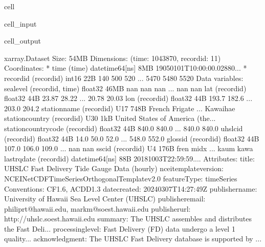 \documentclass[letterpaper,10pt,english]{jupyterBook}
\begin{document}
\begin{sphinxuseclass}{cell}
\begin{sphinxVerbatimInput}
\begin{sphinxuseclass}{cell_input}
\begin{sphinxVerbatim}[commandchars=\\\{\}]
\end{sphinxVerbatim}

\end{sphinxuseclass}\end{sphinxVerbatimInput}
\begin{sphinxVerbatimOutput}

\begin{sphinxuseclass}{cell_output}
\begin{sphinxVerbatim}[commandchars=\\\{\}]
\PYGZlt{}xarray.Dataset\PYGZgt{} Size: 54MB
Dimensions:               (time: 1043870, record\PYGZus{}id: 11)
Coordinates:
  * time                  (time) datetime64[ns] 8MB 1905\PYGZhy{}01\PYGZhy{}01T10:00:00.02880...
  * record\PYGZus{}id             (record\PYGZus{}id) int16 22B 140 500 520 ... 5470 5480 5520
Data variables:
    sea\PYGZus{}level             (record\PYGZus{}id, time) float32 46MB nan nan nan ... nan nan
    lat                   (record\PYGZus{}id) float32 44B 23.87 28.22 ... 20.78 20.03
    lon                   (record\PYGZus{}id) float32 44B 193.7 182.6 ... 203.0 204.2
    station\PYGZus{}name          (record\PYGZus{}id) \PYGZlt{}U17 748B \PYGZsq{}French Frigate\PYGZsq{} ... \PYGZsq{}Kawaihae\PYGZsq{}
    station\PYGZus{}country       (record\PYGZus{}id) \PYGZlt{}U30 1kB \PYGZsq{}United States of America (the...
    station\PYGZus{}country\PYGZus{}code  (record\PYGZus{}id) float32 44B 840.0 840.0 ... 840.0 840.0
    uhslc\PYGZus{}id              (record\PYGZus{}id) float32 44B 14.0 50.0 52.0 ... 548.0 552.0
    gloss\PYGZus{}id              (record\PYGZus{}id) float32 44B 107.0 106.0 109.0 ... nan nan
    ssc\PYGZus{}id                (record\PYGZus{}id) \PYGZlt{}U4 176B \PYGZsq{}fren\PYGZsq{} \PYGZsq{}midx\PYGZsq{} ... \PYGZsq{}kaum\PYGZsq{} \PYGZsq{}kawa\PYGZsq{}
    last\PYGZus{}rq\PYGZus{}date          (record\PYGZus{}id) datetime64[ns] 88B 2018\PYGZhy{}10\PYGZhy{}03T22:59:59....
Attributes:
    title:                  UHSLC Fast Delivery Tide Gauge Data (hourly)
    ncei\PYGZus{}template\PYGZus{}version:  NCEI\PYGZus{}NetCDF\PYGZus{}TimeSeries\PYGZus{}Orthogonal\PYGZus{}Template\PYGZus{}v2.0
    featureType:            timeSeries
    Conventions:            CF\PYGZhy{}1.6, ACDD\PYGZhy{}1.3
    date\PYGZus{}created:           2024\PYGZhy{}03\PYGZhy{}07T14:27:49Z
    publisher\PYGZus{}name:         University of Hawaii Sea Level Center (UHSLC)
    publisher\PYGZus{}email:        philiprt@hawaii.edu, markm@soest.hawaii.edu
    publisher\PYGZus{}url:          http://uhslc.soest.hawaii.edu
    summary:                The UHSLC assembles and distributes the Fast Deli...
    processing\PYGZus{}level:       Fast Delivery (FD) data undergo a level 1 quality...
    acknowledgment:         The UHSLC Fast Delivery database is supported by ...
\end{sphinxVerbatim}

\end{sphinxuseclass}\end{sphinxVerbatimOutput}

\end{sphinxuseclass}
\end{document}
